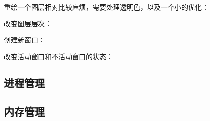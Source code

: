 重绘一个图层相对比较麻烦，需要处理透明色，以及一个小的优化：
{\linespread{1}}

改变图层层次：
{\linespread{1}}

创建新窗口：
{\linespread{1}}

改变活动窗口和不活动窗口的状态：
{\linespread{1}}

\subsection{进程管理}
\label{sub:进程管理}

{\linespread{1}}

{\linespread{1}}
{\linespread{1}}
{\linespread{1}}
{\linespread{1}}
{\linespread{1}}
{\linespread{1}}
{\linespread{1}}

\subsection{内存管理}
\label{sub:内存管理}

{\linespread{1}}
{\linespread{1}}

{\linespread{1}}
{\linespread{1}}
{\linespread{1}}
{\linespread{1}}

